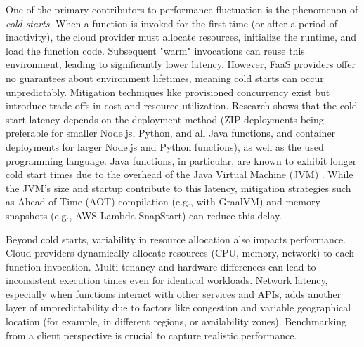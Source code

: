 



One of the primary contributors to performance fluctuation is the phenomenon of \emph{cold starts}. When a function is invoked for the first time (or after a period of inactivity), the cloud provider must allocate resources, initialize the runtime, and load the function code. Subsequent "warm" invocations can reuse this environment, leading to significantly lower latency. However, FaaS providers offer no guarantees about environment lifetimes, meaning cold starts can occur unpredictably. Mitigation techniques like provisioned concurrency exist but introduce trade-offs in cost and resource utilization. Research \cite{dantas2022application} shows that the cold start latency depends on the deployment method (ZIP deployments being preferable for smaller Node.js, Python, and all Java functions, and container deployments for larger Node.js and Python functions), as well as the used programming language. 
Java functions, in particular, are known to exhibit longer cold start times due to the overhead of the Java Virtual Machine (JVM) \cite{wu2022performance}. While the JVM's size and startup contribute to this latency, mitigation strategies such as Ahead-of-Time (AOT) compilation (e.g., with GraalVM) and memory snapshots (e.g., AWS Lambda SnapStart) can reduce this delay.

Beyond cold starts, variability in resource allocation \cite{ginzburg2020serverless} also impacts performance. Cloud providers dynamically allocate resources (CPU, memory, network) to each function invocation. Multi-tenancy and hardware differences can lead to inconsistent execution times even for identical workloads. Network latency, especially when functions interact with other services and APIs, adds another layer of unpredictability due to factors like congestion and variable geographical location (for example, in different regions, or availability zones). Benchmarking from a client perspective is crucial to capture realistic performance.

